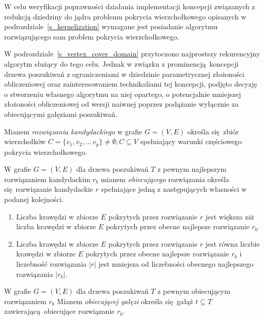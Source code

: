 \par{
  W celu weryfikacji poprawności działania implementacji koncepcji związanych z redukcją dziedziny do jądra problemu pokrycia wierzchołkowego opisanych w podrozdziale~\ref{s_kernelization} wymagane jest posiadanie algorytmu rozwiązującego sam problem pokrycia wierzchołkowego.

  W podrozdziale~\ref{s_vertex_cover_domain} przytoczono najprostszy rekurencyjny algorytm służący do tego celu.
  Jednak w związku z prominencją koncepcji drzewa poszukiwań z ograniczeniami w dziedzinie parametrycznej złożoności obliczeniowej oraz zainteresowaniem technikaliami tej koncepcji, podjęto decyzję o stworzeniu własnego algorytmu na niej opartego, o potencjalnie mniejszej złożoności obliczeniowej od wersji naiwnej poprzez podążanie wyłącznie za obiecującymi gałęziami poszukiwań.

  \begin{definition}
    Mianem \emph{rozwiązania kandydackiego} w grafie $G=(V, E)$ określa się zbiór wierzchołków $C=\{v_1, v_2, \ldots\, v_p\} \neq \emptyset; C \subseteq V$ spełniający warunki częściowego pokrycia wierzchołkowego.
  \end{definition}
  \begin{definition}
    W grafie $G=(V,E)$ dla drzewa poszukiwań $T$ z pewnym najlepszym rozwiązaniem kandydackim $r_b$ mianem \emph{obiecującego} rozwiązania określa się rozwiązanie kandydackie $r$ spełniające jedną z następujących własności w podanej kolejności.
    \begin{enumerate}
      \item Liczba krawędzi w zbiorze $E$ pokrytych przez rozwiązanie $r$ jest większa niż liczba krawędzi w zbiorze $E$ pokrytych przez obecne najlepsze rozwiązanie $r_b$.
      \item Liczba krawędzi w zbiorze $E$ pokrytych przez rozwiązanie $r$ jest równa liczbie krawędzi w zbiorze $E$ pokrytych przez obecne najlepsze rozwiązanie $r_b$ i liczebność rozwiązania $|r|$ jest mniejsza od liczebności obecnego najlepszego rozwiązania $|r_b|$.
    \end{enumerate}
  \end{definition}
  \begin{definition}
     W grafie $G=(V, E)$ dla drzewa poszukiwań $T$ z pewnym obiecującym rozwiązaniem $r_b$ Mianem \emph{obiecującej gałęzi} określa się gałąź $t \subseteq T$ zawierającą obiecujące rozwiązanie $r_b$.
  \end{definition}
}
